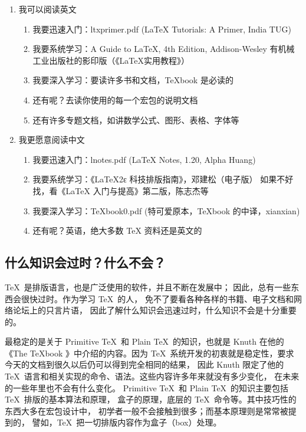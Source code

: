 \begin{enumerate}
\item 我可以阅读英文

\begin{enumerate}
\item 我要迅速入门：ltxprimer.pdf (LaTeX Tutorials: A Primer, India TUG)
\item 我要系统学习：A Guide to LaTeX, 4th Edition, Addison-Wesley
      有机械工业出版社的影印版（《LaTeX实用教程》）
\item 我要深入学习：要读许多书和文档，TeXbook 是必读的
\item 还有呢？去读你使用的每一个宏包的说明文档
\item 还有许多专题文档，如讲数学公式、图形、表格、字体等
\end{enumerate}

\item 我更愿意阅读中文
\begin{enumerate}
\item 我要迅速入门：lnotes.pdf (LaTeX Notes, 1.20, Alpha Huang)
\item 我要系统学习：《LaTeX2ε 科技排版指南》，邓建松（电子版）
 如果不好找，看《LaTeX 入门与提高》第二版，陈志杰等
\item 我要深入学习：TeXbook0.pdf (特可爱原本，TeXbook 的中译，xianxian)
\item 还有呢？英语，绝大多数 TeX 资料还是英文的
\end{enumerate}
\end{enumerate}

\subsection{什么知识会过时？什么不会？}

\TeX\ 是排版语言，也是广泛使用的软件，并且不断在发展中；
因此，总有一些东西会很快过时。作为学习 \TeX\ 的人，
免不了要看各种各样的书籍、电子文档和网络论坛上的只言片语，
因此了解什么知识会迅速过时，什么知识不会是十分重要的。

最稳定的是关于 Primitive \TeX\ 和 Plain \TeX\ 的知识，也就是 Knuth
在他的《The TeXbook 》中介绍的内容。因为 \TeX\
系统开发的初衷就是稳定性，要求今天的文档到很久以后仍可以得到完全相同的结果，
因此 Knuth 限定了他的 \TeX\ 语言和相关实现的命令、语法。这些内容许多年来就没有多少变化，
在未来的一些年里也不会有什么变化。
Primitive \TeX\ 和 Plain \TeX\ 的知识主要包括 \TeX\ 排版的基本算法和原理，
盒子的原理，底层的 \TeX\ 命令等。其中技巧性的东西大多在宏包设计中，
初学者一般不会接触到很多；而基本原理则是常常被提到的，
譬如，\TeX\ 把一切排版内容作为盒子（box）处理。

